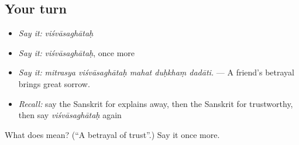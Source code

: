 \subsection*{Your turn}
\begin{itemize}
\raggedright
  \item \emph{Say it:} \emph{viśvāsaghātaḥ}
  \item \emph{Say it:} \emph{viśvāsaghātaḥ}, once more
  \item \emph{Say it:} \emph{mitrasya viśvāsaghātaḥ mahat duḥkhaṃ dadāti.} — A friend's betrayal brings great sorrow.
  \item \emph{Recall:} say the Sanskrit for explains away, then the Sanskrit for trustworthy, then say \emph{viśvāsaghātaḥ} again
\end{itemize}

\begin{tcolorbox}[breakable,colback=teal!4,colframe=teal!35!black,title={Before you move on}]
What does  mean? (\textquotedblleft{}A betrayal of trust\textquotedblright{}.) Say it once more.
\end{tcolorbox}

